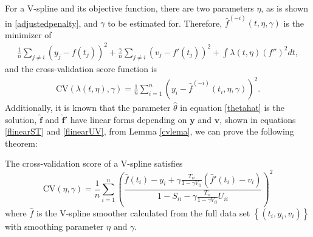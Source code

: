 For a V-spline and its objective function, there are two parameters $\eta$, as is shown in \eqref{adjustedpenalty}, and $\gamma$ to be estimated for. Therefore, $\hat{f}^{(-i)}(t,\eta,\gamma)$ is the minimizer of  
\begin{align}
\frac{1}{n}\sum_{j \neq i}\left( y_j-f(t_j) \right)^2+\frac{\gamma}{n}\sum_{j \neq i} \left( v_j-f'(t_j) \right)^2+ \int \lambda(t,\eta) \left( f'' \right)^2dt,
\end{align}
and the cross-validation score function is
\begin{align}
\mbox{CV}\left(\lambda(t,\eta),\gamma\right)=\frac{1}{n}\sum_{i=1}^{n}\left( y_i-\hat{f}^{(-i)}\left(t_i,\eta,\gamma\right) \right) ^2.
\end{align}
Additionally, it is known that the parameter $\hat{\theta}$ in equation \eqref{thetahat} is the solution, $\mathbf{\hat{f}}$ and $\mathbf{\hat{f}'}$ have linear forms depending on $\mathbf{y}$ and $\mathbf{v}$, shown in equations \eqref{flinearST} and \eqref{flinearUV}, 
from Lemma \ref{cvlema}, we can prove the following theorem: 
\begin{theorem}\label{tractorsplinecvscore}
The cross-validation score of a V-spline satisfies
\begin{equation}\label{tractorcv}
\mbox{CV}\left(\eta,\gamma\right)=\frac{1}{n}\sum_{i=1}^{n} \left( \frac{\hat{f}(t_i)-y_i+\gamma \frac{T_{ii}}{1-\gamma V_{ii}}(\hat{f}'(t_i)-v_i)}{1-S_{ii}-\gamma\frac{T_{ii}}{1-\gamma V_{ii}}U_{ii}} \right)^2
\end{equation}
where $\hat{f}$ is the V-spline smoother calculated from the full data set $\left\lbrace (t_i,y_i,v_i)\right\rbrace$ with smoothing parameter $\eta$ and $\gamma$.
\end{theorem}

